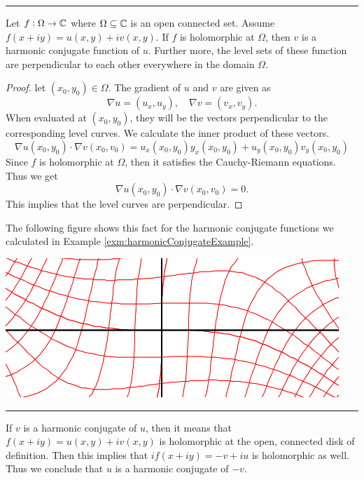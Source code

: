 \hrule

\begin{fact}
	Let $f: \Omega \to \mathbb{C}$ where $\Omega \subseteq \mathbb{C}$ is an open connected set. Assume $f(x+iy) = u(x,y) + i v(x,y)$. If $f$ is holomorphic at $\Omega$, then $v$ is a harmonic conjugate function of $u$. Further more, the level sets of these function are perpendicular to each other everywhere in the domain $\Omega$.
\end{fact}

\begin{proof}
	let $(x_0,y_0) \in \Omega$. The gradient of $u$ and $v$ are given as
	\[ \nabla u = (u_x, u_y), \quad \nabla v = (v_x, v_y). \]
	When evaluated at $(x_0, y_0)$, they will be the vectors perpendicular to the corresponding level curves. We calculate the inner product of these vectors.
	\[ \nabla u (x_0, y_0) \cdot \nabla v(x_0, v_0) = u_x(x_0,y_0) y_x(x_0, y_0) + u_y(x_0, y_0) v_y(x_0, y_0) \]
	Since $f$ is holomorphic at $\Omega$, then it satisfies the Cauchy-Riemann equations. Thus we get 
	\[ \nabla u (x_0, y_0) \cdot \nabla v(x_0, v_0) = 0. \] 
	This implies that the level curves are perpendicular.
\end{proof}
The following figure shows this fact for the harmonic conjugate functions we calculated in Example \autoref{exm:harmonicConjugateExample}.
\begin{center}
	\includegraphics[scale=0.5]{Images/HarmonicConjugate.png}
\end{center}


\hrule

\begin{fact}
	If $v$ is a harmonic conjugate of $u$, then it means that $f(x+iy)=u(x,y) + i v(x,y)$ is holomorphic at the open, connected disk of definition. Then this implies that $if(x+iy)=-v + iu$ is holomorphic as well. Thus we conclude that $u$ is a harmonic conjugate of $-v$.
\end{fact}

